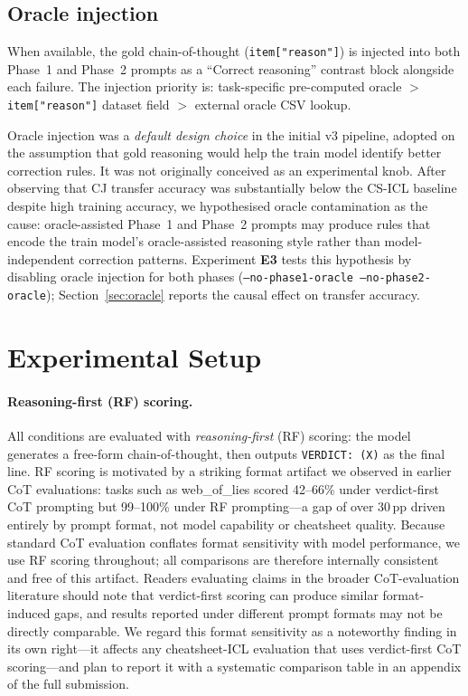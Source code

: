 \documentclass{article}
\begin{document}
\subsection{Oracle injection}
\label{sec:oracle_method}

When available, the gold chain-of-thought (\texttt{item["reason"]}) is injected into both
Phase~1 and Phase~2 prompts as a ``Correct reasoning'' contrast block alongside each failure.
The injection priority is: task-specific pre-computed oracle $>$ \texttt{item["reason"]}
dataset field $>$ external oracle CSV lookup.

Oracle injection was a \emph{default design choice} in the initial v3 pipeline, adopted
on the assumption that gold reasoning would help the train model identify better correction
rules.
It was not originally conceived as an experimental knob.
After observing that CJ transfer accuracy was substantially below the CS-ICL baseline
despite high training accuracy, we hypothesised oracle contamination as the cause:
oracle-assisted Phase~1 and Phase~2 prompts may produce rules that encode
the train model's oracle-assisted reasoning style rather than model-independent
correction patterns.
Experiment \textbf{E3} tests this hypothesis by disabling oracle injection for both phases
(\texttt{--no-phase1-oracle --no-phase2-oracle}); Section~\ref{sec:oracle} reports the
causal effect on transfer accuracy.



\section{Experimental Setup}
\label{sec:eval}

\paragraph{Reasoning-first (RF) scoring.}
All conditions are evaluated with \emph{reasoning-first} (RF) scoring: the model generates a
free-form chain-of-thought, then outputs \texttt{VERDICT:~(X)} as the final line.
RF scoring is motivated by a striking format artifact we observed in earlier CoT evaluations:
tasks such as web\_of\_lies scored 42--66\% under verdict-first CoT prompting
but 99--100\% under RF prompting---a gap of over 30\,pp driven entirely by prompt format,
not model capability or cheatsheet quality.
Because standard CoT evaluation conflates format sensitivity with model performance,
we use RF scoring throughout; all comparisons are therefore internally consistent
and free of this artifact.
Readers evaluating claims in the broader CoT-evaluation literature should note that
verdict-first scoring can produce similar format-induced gaps, and results reported
under different prompt formats may not be directly comparable.
We regard this format sensitivity as a noteworthy finding in its own right---it affects any
cheatsheet-ICL evaluation that uses verdict-first CoT scoring---and plan to report it with a
systematic comparison table in an appendix of the full submission.
\end{document}
